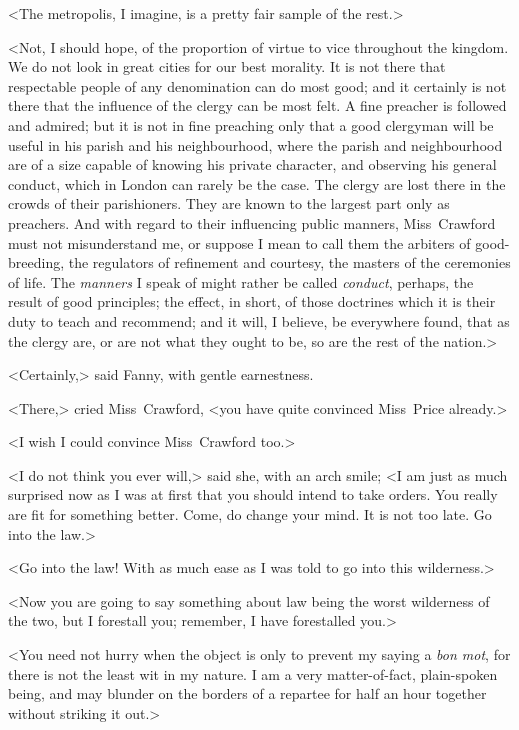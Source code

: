 <The metropolis, I imagine, is a pretty fair sample of the rest.>

<Not, I should hope, of the proportion of virtue to vice throughout the kingdom. We do not look in great cities for our best morality. It is not there that respectable people of any denomination can do most good; and it certainly is not there that the influence of the clergy can be most felt. A fine preacher is followed and admired; but it is not in fine preaching only that a good clergyman will be useful in his parish and his neighbourhood, where the parish and neighbourhood are of a size capable of knowing his private character, and observing his general conduct, which in London can rarely be the case. The clergy are lost there in the crowds of their parishioners. They are known to the largest part only as preachers. And with regard to their influencing public manners, Miss~Crawford must not misunderstand me, or suppose I mean to call them the arbiters of good-breeding, the regulators of refinement and courtesy, the masters of the ceremonies of life. The \textit{manners}  I speak of might rather be called \textit{conduct}, perhaps, the result of good principles; the effect, in short, of those doctrines which it is their duty to teach and recommend; and it will, I believe, be everywhere found, that as the clergy are, or are not what they ought to be, so are the rest of the nation.>

<Certainly,> said Fanny, with gentle earnestness.

<There,> cried Miss~Crawford, <you have quite convinced Miss~Price already.>

<I wish I could convince Miss~Crawford too.>

<I do not think you ever will,> said she, with an arch smile; <I am just as much surprised now as I was at first that you should intend to take orders. You really are fit for something better. Come, do change your mind. It is not too late. Go into the law.>

<Go into the law! With as much ease as I was told to go into this wilderness.>

<Now you are going to say something about law being the worst wilderness of the two, but I forestall you; remember, I have forestalled you.>

<You need not hurry when the object is only to prevent my saying a \textit{bon mot}, for there is not the least wit in my nature. I am a very matter-of-fact, plain-spoken being, and may blunder on the borders of a repartee for half an hour together without striking it out.>

